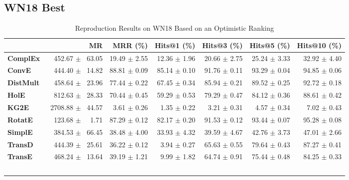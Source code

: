 \documentclass[journal]{IEEEtran}
\begin{document}
\subsection{WN18 Best}
\begin{table*}
    \caption{Reproduction Results on WN18 Based on an Optimistic Ranking}
    \label{tab:wn18_full_results_optimistic_ranking}
    \centering
    \begin{tabular}{lrrrrrr}
\toprule
{} &                 MR &      MRR (\%) &   Hits@1 (\%) &   Hits@3 (\%) &   Hits@5 (\%) &  Hits@10 (\%) \\
\midrule
\textbf{ComplEx } &  $\phantom{5}$$\phantom{5}$452.67 $\pm$ $\phantom{5}$63.05 &  19.49 $\pm$ 2.55 &  12.36 $\pm$ 1.96 &  20.66 $\pm$ 2.75 &  25.24 $\pm$ 3.33 &  32.92 $\pm$ 4.40 \\
\textbf{ConvE   } &  $\phantom{5}$$\phantom{5}$444.40 $\pm$ $\phantom{5}$14.82 &  88.81 $\pm$ 0.09 &  85.14 $\pm$ 0.10 &  91.76 $\pm$ 0.11 &  93.29 $\pm$ 0.04 &  94.85 $\pm$ 0.06 \\
\textbf{DistMult} &  $\phantom{5}$$\phantom{5}$458.64 $\pm$ $\phantom{5}$23.96 &  77.44 $\pm$ 0.22 &  67.45 $\pm$ 0.34 &  85.94 $\pm$ 0.21 &  89.52 $\pm$ 0.25 &  92.72 $\pm$ 0.18 \\
\textbf{HolE    } &  $\phantom{5}$$\phantom{5}$812.63 $\pm$ $\phantom{5}$28.33 &  70.44 $\pm$ 0.45 &  59.29 $\pm$ 0.53 &  79.29 $\pm$ 0.47 &  84.12 $\pm$ 0.36 &  88.61 $\pm$ 0.42 \\
\textbf{KG2E    } &  $\phantom{5}$2708.88 $\pm$ $\phantom{5}$44.57 &  $\phantom{5}$3.61 $\pm$ 0.26 &  $\phantom{5}$1.35 $\pm$ 0.22 &  $\phantom{5}$3.21 $\pm$ 0.31 &  $\phantom{5}$4.57 $\pm$ 0.34 &  $\phantom{5}$7.02 $\pm$ 0.43 \\
\textbf{RotatE  } &  $\phantom{5}$$\phantom{5}$123.68 $\pm$ $\phantom{5}$$\phantom{5}$1.71 &  87.29 $\pm$ 0.12 &  82.17 $\pm$ 0.20 &  91.53 $\pm$ 0.12 &  93.44 $\pm$ 0.07 &  95.28 $\pm$ 0.08 \\
\textbf{SimplE  } &  $\phantom{5}$$\phantom{5}$384.53 $\pm$ $\phantom{5}$66.45 &  38.48 $\pm$ 4.00 &  33.93 $\pm$ 4.32 &  39.59 $\pm$ 4.67 &  42.76 $\pm$ 3.73 &  47.01 $\pm$ 2.66 \\
\textbf{TransD  } &  $\phantom{5}$$\phantom{5}$444.39 $\pm$ $\phantom{5}$25.61 &  36.22 $\pm$ 0.12 &  $\phantom{5}$3.94 $\pm$ 0.27 &  65.63 $\pm$ 0.55 &  79.64 $\pm$ 0.43 &  87.27 $\pm$ 0.41 \\
\textbf{TransE  } &  $\phantom{5}$$\phantom{5}$468.24 $\pm$ $\phantom{5}$13.64 &  39.19 $\pm$ 1.21 &  $\phantom{5}$9.99 $\pm$ 1.82 &  64.74 $\pm$ 0.91 &  75.44 $\pm$ 0.48 &  84.25 $\pm$ 0.33 \\
$$
\end{tabular}
\end{table*}
\end{document}
